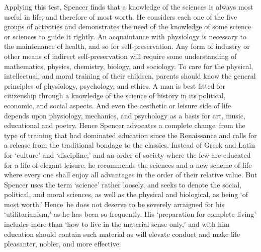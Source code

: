 \documentclass[
]{book}
\begin{document}
Applying this test, Spencer finds that a knowledge of the sciences is always most useful in life, and therefore of most worth. He considers each one of the five groups of activities and demonstrates the need of the knowledge of some science or sciences to guide it rightly. An acquaintance with physiology is necessary to the maintenance of health, and so for self-preservation. Any form of industry or other means of indirect self-preservation will require some understanding of mathematics, physics, chemistry, biology, and sociology. To care for the physical, intellectual, and moral training of their children, parents should know the general principles of physiology, psychology, and ethics. A man is best fitted for citizenship through a knowledge of the science of history in its political, economic, and social aspects. And even the aesthetic or leisure side of life depends upon physiology, mechanics, and psychology as a basis for art, music, educational and poetry. Hence Spencer advocates a complete change~from the type of training that had dominated education since the Renaissance and calls for a release from the traditional bondage to the classics. Instead of Greek and Latin for `culture' and `discipline,' and an order of society where the few are educated for a life of elegant leisure, he recommends the sciences and a new scheme of life where every one shall enjoy all advantages in the order of their relative value. But Spencer uses the term `science' rather loosely, and seeks to denote the social, political, and moral sciences, as well as the physical and biological, as being `of most worth.' Hence~he does not deserve to be severely arraigned for his `utilitarianism,' as he has been so frequently. His `preparation for complete living' includes more than `how to live in the material sense only,' and with him education should contain such material as will elevate conduct and make life pleasanter, nobler, and more effective.
\end{document}
